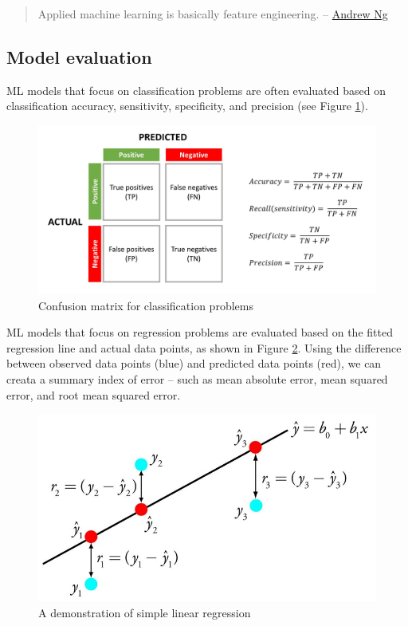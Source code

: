 \documentclass[]{book}
\begin{document}
\begin{quote}
Applied machine learning is basically feature engineering. -- \href{https://en.wikipedia.org/wiki/Andrew_Ng}{Andrew Ng}
\end{quote}

\hypertarget{model-evaluation}{%
\subsection{Model evaluation}\label{model-evaluation}}

ML models that focus on classification problems are often evaluated based on classification accuracy, sensitivity, specificity, and precision (see Figure \ref{fig:fig5-3a}).

\begin{figure}
\includegraphics[width=1\linewidth]{images/confusion_matrix_combined} \caption{Confusion matrix for classification problems}\label{fig:fig5-3a}
\end{figure}

ML models that focus on regression problems are evaluated based on the fitted regression line and actual data points, as shown in Figure \ref{fig:fig5-3b}. Using the difference between observed data points (blue) and predicted data points (red), we can creata a summary index of error -- such as mean absolute error, mean squared error, and root mean squared error.

\begin{figure}
\includegraphics[width=0.95\linewidth]{images/regression} \caption{A demonstration of simple linear regression}\label{fig:fig5-3b}
\end{figure}
\end{document}
